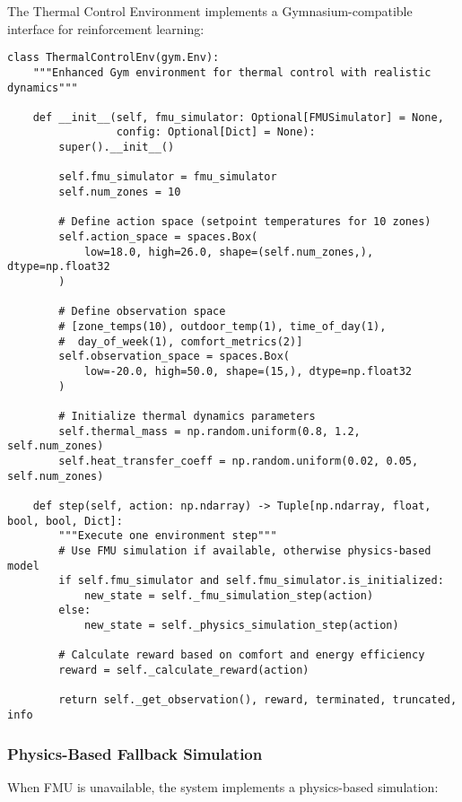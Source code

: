\documentclass[12pt,a4paper]{article}
\begin{document}
{The Thermal Control Environment implements a Gymnasium-compatible interface for reinforcement learning:

\begin{lstlisting}[style=python, caption=Thermal Control Environment]
class ThermalControlEnv(gym.Env):
    """Enhanced Gym environment for thermal control with realistic dynamics"""
    
    def __init__(self, fmu_simulator: Optional[FMUSimulator] = None, 
                 config: Optional[Dict] = None):
        super().__init__()
        
        self.fmu_simulator = fmu_simulator
        self.num_zones = 10
        
        # Define action space (setpoint temperatures for 10 zones)
        self.action_space = spaces.Box(
            low=18.0, high=26.0, shape=(self.num_zones,), dtype=np.float32
        )
        
        # Define observation space
        # [zone_temps(10), outdoor_temp(1), time_of_day(1), 
        #  day_of_week(1), comfort_metrics(2)]
        self.observation_space = spaces.Box(
            low=-20.0, high=50.0, shape=(15,), dtype=np.float32
        )
        
        # Initialize thermal dynamics parameters
        self.thermal_mass = np.random.uniform(0.8, 1.2, self.num_zones)
        self.heat_transfer_coeff = np.random.uniform(0.02, 0.05, self.num_zones)
        
    def step(self, action: np.ndarray) -> Tuple[np.ndarray, float, bool, bool, Dict]:
        """Execute one environment step"""
        # Use FMU simulation if available, otherwise physics-based model
        if self.fmu_simulator and self.fmu_simulator.is_initialized:
            new_state = self._fmu_simulation_step(action)
        else:
            new_state = self._physics_simulation_step(action)
        
        # Calculate reward based on comfort and energy efficiency
        reward = self._calculate_reward(action)
        
        return self._get_observation(), reward, terminated, truncated, info
\end{lstlisting}

\subsubsection{Physics-Based Fallback Simulation}

When FMU is unavailable, the system implements a physics-based simulation:

}
\end{document}

